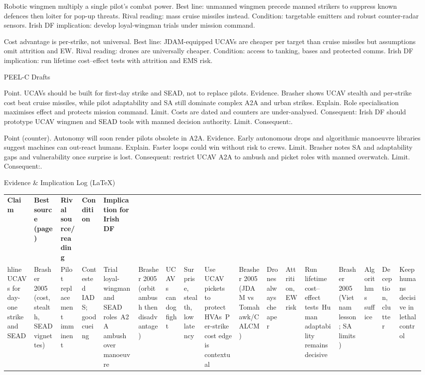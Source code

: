 Robotic wingmen multiply a single pilot’s combat power.
Best line: unmanned wingmen precede manned strikers to suppress known defences then loiter for pop-up threats.
Rival reading: mass cruise missiles instead.
Condition: targetable emitters and robust counter-radar sensors.
Irish DF implication: develop loyal-wingman trials under mission command.

Cost advantage is per-strike, not universal.
Best line: JDAM-equipped UCAVs are cheaper per target than cruise missiles but assumptions omit attrition and EW.
Rival reading: drones are universally cheaper.
Condition: access to tanking, bases and protected comms.
Irish DF implication: run lifetime cost–effect tests with attrition and EMS risk.

PEEL-C Drafts

Point. UCAVs should be built for first-day strike and SEAD, not to replace pilots.
Evidence. Brasher shows UCAV stealth and per-strike cost beat cruise missiles, while pilot adaptability and SA still dominate complex A2A and urban strikes.
Explain. Role specialisation maximises effect and protects mission command.
Limit. Costs are dated and counters are under-analysed. Consequent: Irish DF should prototype UCAV wingmen and SEAD tools with manned decision authority. Limit. Consequent:.

Point (counter). Autonomy will soon render pilots obsolete in A2A.
Evidence. Early autonomous drops and algorithmic manoeuvre libraries suggest machines can out-react humans.
Explain. Faster loops could win without risk to crews.
Limit. Brasher notes SA and adaptability gaps and vulnerability once surprise is lost. Consequent: restrict UCAV A2A to ambush and picket roles with manned overwatch. Limit. Consequent:.

Evidence & Implication Log (LaTeX)

\usepackage{array}
\begin{tabular}{p{3.2cm}p{4.2cm}p{3.6cm}p{3.2cm}p{4.2cm}}
	\textbf{Claim} & \textbf{Best source (page)} & \textbf{Rival source/reading} & \textbf{Condition} & \textbf{Implication for Irish DF}\\hline
	UCAVs for day-one strike and SEAD & Brasher 2005 (cost, stealth, SEAD vignettes) & Pilot replacement imminent & Contested IADS; good cueing & Trial loyal-wingman and SEAD roles\
	A2A ambush over manoeuvre & Brasher 2005 (orbit ambush then disadvantage) & UCAVs can dogfight & Surprise, stealth, low latency & Use UCAV pickets to protect HVAs\
	Per-strike cost edge is contextual & Brasher 2005 (JDAM vs Tomahawk/CALCM) & Drones always cheaper & Attrition, EW risk & Run lifetime cost–effect tests\
	Human adaptability remains decisive & Brasher 2005 (Vietnam lesson; SA limits) & Algorithms suffice & Deception, clutter & Keep humans decisive in lethal control\
\end{tabular}


